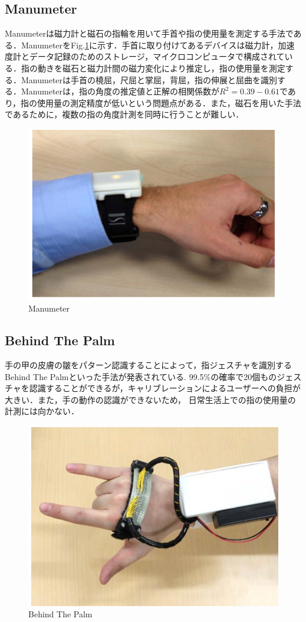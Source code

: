 \subsection*{Manumeter}
Manumeter\cite{Friedman2014}は磁力計と磁石の指輪を用いて手首や指の使用量を測定する手法である．ManumeterをFig.\ref{fig:Manumeter}に示す．手首に取り付けてあるデバイスは磁力計，加速度計とデータ記録のためのストレージ，マイクロコンピュータで構成されている．指の動きを磁石と磁力計間の磁力変化により推定し，指の使用量を測定する．Manumeterは手首の橈屈，尺屈と掌屈，背屈，指の伸展と屈曲を識別する．Manumeterは，指の角度の推定値と正解の相関係数が$R^2=0.39-0.61$であり，指の使用量の測定精度が低いという問題点がある．また，磁石を用いた手法であるために，複数の指の角度計測を同時に行うことが難しい．
\begin{figure}[H]
  \centering
  \includegraphics[width=0.6\linewidth]{fig/ch1/manumeter}
  \caption{Manumeter\cite{Friedman2014}}
  \label{fig:Manumeter}
\end{figure}

\subsection*{Behind The Palm}
手の甲の皮膚の皺をパターン認識することによって，指ジェスチャを識別するBehind The Palm\cite{Recognition2017}といった手法が発表されている.
99.5\%の確率で20個ものジェスチャを認識することができるが，キャリブレーションによるユーザーへの負担が大きい．また，手の動作の認識ができないため，
日常生活上での指の使用量の計測には向かない．
\begin{figure}[H]
  \centering
  \includegraphics[width=0.6\linewidth]{fig/ch1/btp}
  \caption{Behind The Palm\cite{Recognition2017}}
  \label{fig:Behind The Palm}
\end{figure}

